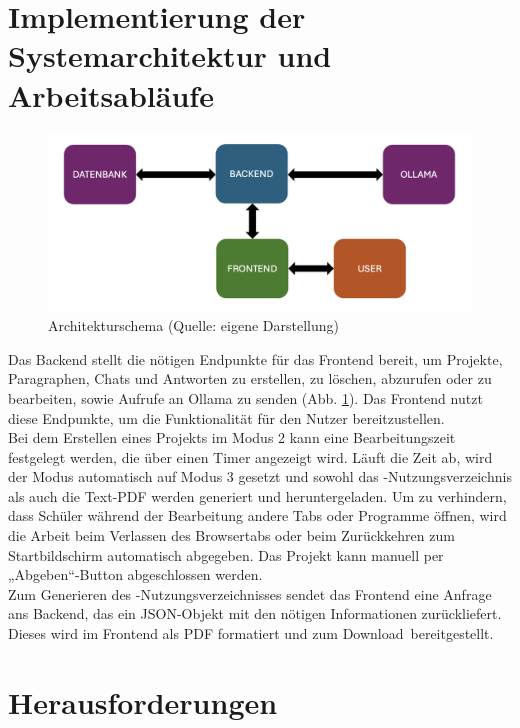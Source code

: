 \documentclass[../main.tex]{subfiles}
\begin{document}
\section{Implementierung der Systemarchitektur und Arbeitsabläufe}
\begin{figure}[h!]
  \includegraphics[scale=0.6]{bilder/Architektur.png}
  \caption{Architekturschema (Quelle: eigene Darstellung)}
  \label{fig:architecture}
\end{figure}
Das Backend stellt die nötigen Endpunkte für das Frontend bereit, um Projekte, Paragraphen, Chats und Antworten zu erstellen, zu löschen, abzurufen oder zu bearbeiten, sowie Aufrufe an Ollama 
zu senden (Abb. \ref{fig:architecture}). Das Frontend nutzt diese Endpunkte, um die Funktionalität für den Nutzer bereitzustellen.\\
Bei dem Erstellen eines Projekts im Modus 2 kann eine Bearbeitungszeit festgelegt werden, die über einen Timer angezeigt wird. Läuft die Zeit ab, wird der Modus automatisch auf Modus 3 gesetzt 
und sowohl das -Nutzungsverzeichnis als auch die Text-PDF werden generiert und heruntergeladen. Um zu verhindern, dass Schüler während der Bearbeitung andere Tabs 
oder Programme öffnen, wird die Arbeit beim Verlassen des Browsertabs \cite{react-onblur} oder beim Zurückkehren zum Startbildschirm automatisch abgegeben. Das Projekt 
kann manuell per „Abgeben“-Button abgeschlossen werden.\\
Zum Generieren des -Nutzungsverzeichnisses sendet das Frontend eine Anfrage ans Backend, das ein JSON-Objekt mit den nötigen Informationen zurückliefert. 
Dieses wird im Frontend als PDF formatiert und zum \mbox{Download bereitgestellt.}


\section{Herausforderungen}
\end{document}
